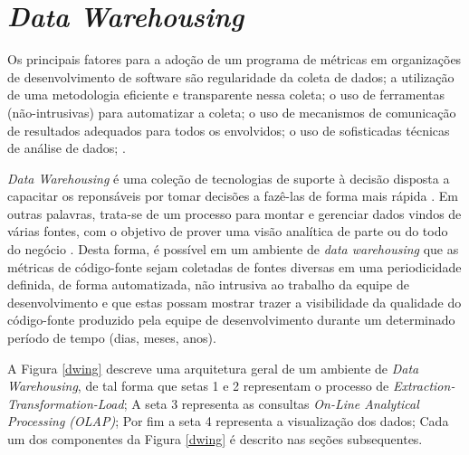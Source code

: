 \chapter{\textit{Data Warehousing}} 

Os principais fatores para a adoção de um programa de métricas em 
organizações de desenvolvimento de software são
regularidade da coleta de dados;
a utilização de uma metodologia eficiente e transparente nessa coleta; 
o uso de ferramentas (não-intrusivas) para automatizar a coleta; 
o uso de mecanismos de comunicação de resultados adequados para todos os envolvidos; 
o uso de sofisticadas técnicas de análise de dados;
.



\textit{Data Warehousing} é uma coleção de tecnologias de suporte à decisão disposta a capacitar os reponsáveis por tomar decisões a fazê-las de forma mais rápida . Em outras palavras, trata-se de um processo para montar e gerenciar dados vindos de várias fontes, com o objetivo de prover uma visão analítica de parte ou do todo do negócio \cite{gardner1998}. Desta forma, é possível em um ambiente de \textit{data warehousing} que as métricas de código-fonte sejam coletadas de fontes diversas em uma periodicidade definida, de forma automatizada, não intrusiva ao trabalho da equipe de desenvolvimento e que estas possam mostrar trazer a visibilidade da qualidade do código-fonte produzido pela equipe de desenvolvimento durante um determinado período de tempo (dias, meses, anos). 

A Figura \ref{dwing} descreve uma arquitetura geral de um ambiente de \textit{Data Warehousing}, de tal forma que setas 1 e 2 representam o processo de \textit{Extraction-Transformation-Load}; A seta 3 representa as consultas \textit{On-Line Analytical Processing (OLAP)}; Por fim a seta 4 representa a visualização dos dados; Cada um dos componentes da Figura \ref{dwing} é descrito nas seções subsequentes.

